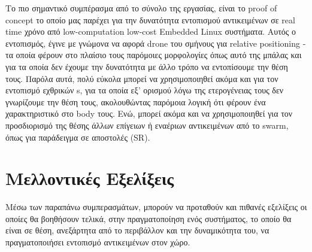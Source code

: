 Το πιο σημαντικό συμπέρασμα από το σύνολο της εργασίας, είναι το proof of concept το οποίο μας παρέχει για την δυνατότητα εντοπισμού αντικειμένων σε real time χρόνο από low-computation low-cost Embedded Linux συστήματα. Αυτός ο εντοπισμός, έγινε με γνώμονα να αφορά drone του σμήνους για relative positioning - τα οποία φέρουν στο πλαίσιο τους παρόμοιες μορφολογίες όπως αυτό της μπάλας και για τα οποία δεν έχουμε την δυνατότητα με άλλο τρόπο να εντοπίσουμε την θέση τους. Παρόλα αυτά, πολύ εύκολα μπορεί να χρησιμοποιηθεί ακόμα και για τον εντοπισμό εχθρικών s, για τα οποία εξ' ορισμού λόγω της ετερογένειας τους δεν γνωρίζουμε την θέση τους, ακολουθώντας παρόμοια λογική ότι φέρουν ένα χαρακτηριστικό στο body τους. Ενώ, μπορεί ακόμα και να χρησιμοποιηθεί για τον προσδιορισμό της θέσης άλλων επίγειων ή εναέριων αντικειμένων από το swarm, όπως για παράδειγμα σε αποστολές (SR).  

\section{Μελλοντικές Εξελίξεις}
Μέσω των παραπάνω συμπερασμάτων, μπορούν να προταθούν και πιθανές εξελίξεις οι οποίες θα βοηθήσουν τελικά, στην πραγματοποίηση ενός συστήματος, το οποίο θα είναι σε θέση, ανεξάρτητα από το περιβάλλον και την δυναμικότητα του, να πραγματοποιήσει εντοπισμό αντικειμένων στον χώρο. 

